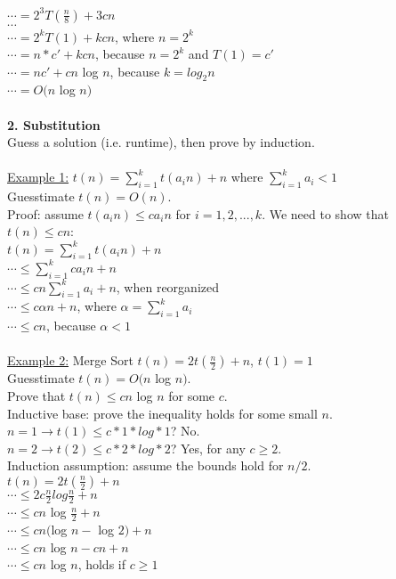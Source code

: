 \documentclass[8pt,letterpaper,twocolumn]{article}
\begin{document}
$\cdots=2^3T(\frac{n}{8})+3cn$\\
$\cdots$\\
$\cdots=2^kT(1)+kcn$, where $n=2^k$\\
$\cdots=n*c'+kcn$, because $n=2^k$ and $T(1)=c'$\\
$\cdots=nc'+cn$ log $n$, because $k=log_2n$\\
$\cdots=O(n$ log $n)$\\
\\
\textbf{2. Substitution}\\
Guess a solution (i.e. runtime), then prove by induction.\\
\\
\underline{Example 1:} $t(n)=\sum_{i=1}^kt(a_in)+n$ where $\sum_{i=1}^ka_i<1$\\
Guesstimate $t(n)=O(n)$.\\
Proof: assume $t(a_in)\leq ca_in$ for $i=1,2,...,k$. We need to show that $t(n) \leq cn$:\\
$t(n)=\sum_{i=1}^kt(a_in)+n$\\
$\cdots \leq \sum_{i=1}^kca_in+n$\\
$\cdots \leq cn\sum_{i=1}^ka_i+n$, when reorganized\\
$\cdots \leq c\alpha n + n$, where $\alpha=\sum_{i=1}^ka_i$\\
$\cdots \leq cn$, because $\alpha<1$\\
\\
\underline{Example 2:} Merge Sort $t(n)=2t(\frac{n}{2})+n$, $t(1)=1$\\
Guesstimate $t(n)=O(n$ log $n)$.\\
Prove that $t(n) \leq cn$ log $n$ for some $c$.\\
Inductive base: prove the inequality holds for some small $n$.\\
$n=1 \rightarrow t(1) \leq c*1*log*1$? No.\\
$n=2 \rightarrow t(2) \leq c*2*log*2$? Yes, for any $c\geq2$.\\
Induction assumption: assume the bounds hold for $n/2$.\\
$t(n)=2t(\frac{n}{2})+n$\\
$\cdots \leq 2c\frac{n}{2}log\frac{n}{2}+n$\\
$\cdots \leq cn$ log $\frac{n}{2}+n$\\
$\cdots \leq cn($log $n-$ log $2)+n$\\
$\cdots \leq cn$ log $n-cn+n$\\
$\cdots \leq cn$ log $n$, holds if $c\geq1$\\
\end{document}
